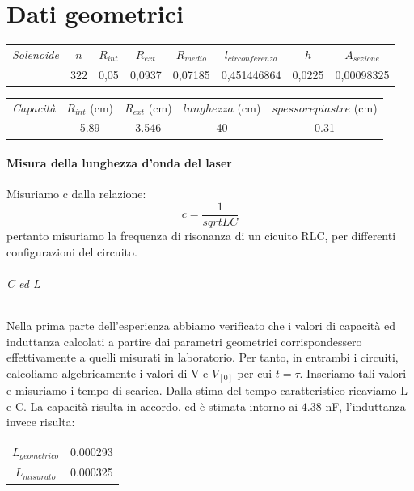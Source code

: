 

\chapter{Dati geometrici}
\begin{center}
\begin{tabular}{|c|c|c|c|c|c|c|c|}
\midrule
\textit{Solenoide} & $n$ & $R_{int}$ & $R_{ext}$ & $R_{medio}$ & $l_{circonferenza}$ & $h$ & $A_{sezione}$  \\
		   & 322 & 0,05	 & 0,0937  & 0,07185 & 0,451446864 & 0,0225 &	0,00098325 \\
 \midrule
\end{tabular}
\end{center}


\begin{center}
\begin{tabular}{|c|c|c|c|c|}
\midrule
\textit{Capacità} & $R_{int}$ (cm) & $R_{ext}$ (cm) & $lunghezza$ (cm) & $spessore piastre$ (cm)\\
   & 5.89 & 3.546  & 40  & 0.31 \\

 \midrule
\end{tabular}
\end{center}

\subsubsection{Misura della lunghezza d'onda del laser}

Misuriamo c dalla relazione:
\begin{equation}
 c=\frac{1}{sqrt{LC}}
\end{equation}
pertanto misuriamo la frequenza di risonanza di un cicuito RLC, per differenti configurazioni del circuito.

\subparagraph*{C ed L}
Nella prima parte dell'esperienza abbiamo verificato che i valori di capacità ed induttanza calcolati a partire dai parametri geometrici corrispondessero effettivamente a quelli misurati in laboratorio. 
Per tanto, in entrambi i circuiti, calcoliamo algebricamente i valori di V e $V_[0]$ per cui $t = \tau$. Inseriamo tali valori e misuriamo i tempo di scarica. Dalla stima del tempo caratteristico ricaviamo L e C. La capacità risulta in accordo, ed è stimata intorno ai $4.38$ nF, l'induttanza invece risulta:

\begin{center}
\begin{tabular}{c c}
$L_{geometrico}$  & 0.000293\\
$L_{misurato}$ & 0.000325\\
\end{tabular}
\end{center}

